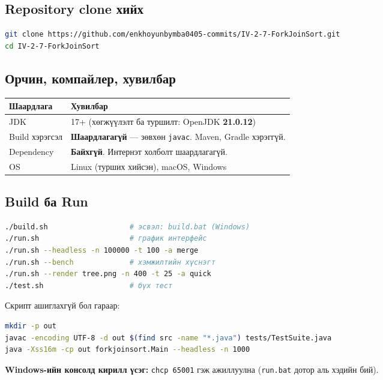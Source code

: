 \documentclass[11pt,a4paper]{article}
\begin{document}
\subsection{Repository clone хийх}
\begin{lstlisting}[language=bash]
git clone https://github.com/enkhoyunbymba0405-commits/IV-2-7-ForkJoinSort.git
cd IV-2-7-ForkJoinSort
\end{lstlisting}

\subsection{Орчин, компайлер, хувилбар}
\begin{center}
\small
\begin{tabular}{lL{9.5cm}}
\toprule
Шаардлага & Хувилбар \\
\midrule
JDK & 17+ (хөгжүүлэлт ба туршилт: OpenJDK \textbf{21.0.12}) \\
Build хэрэгсэл & \textbf{Шаардлагагүй} --- зөвхөн \texttt{javac}. Maven, Gradle хэрэггүй. \\
Dependency & \textbf{Байхгүй}. Интернэт холболт шаардлагагүй. \\
OS & Linux (турших хийсэн), macOS, Windows \\
\bottomrule
\end{tabular}
\end{center}

\subsection{Build ба Run}
\begin{lstlisting}[language=bash]
./build.sh                   # эсвэл: build.bat (Windows)
./run.sh                     # график интерфейс
./run.sh --headless -n 100000 -t 100 -a merge
./run.sh --bench             # хэмжилтийн хүснэгт
./run.sh --render tree.png -n 400 -t 25 -a quick
./test.sh                    # бүх тест
\end{lstlisting}

Скрипт ашиглахгүй бол гараар:
\begin{lstlisting}[language=bash]
mkdir -p out
javac -encoding UTF-8 -d out $(find src -name "*.java") tests/TestSuite.java
java -Xss16m -cp out forkjoinsort.Main --headless -n 1000
\end{lstlisting}

\textbf{Windows-ийн консолд кирилл үсэг:} \texttt{chcp 65001} гэж ажиллуулна
(\texttt{run.bat} дотор аль хэдийн бий).
\end{document}
